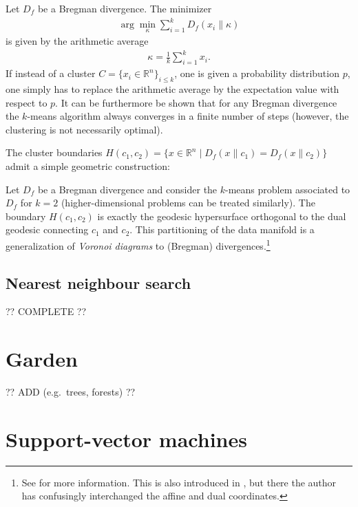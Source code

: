     \begin{property}
        Let $D_f$ be a Bregman divergence. The minimizer
        \begin{gather}
            \arg\min_\kappa\sum_{i=1}^kD_f(x_i\|\kappa)
        \end{gather}
        is given by the arithmetic average
        \begin{gather}
            \kappa = \frac{1}{k}\sum_{i=1}^kx_i.
        \end{gather}
        If instead of a cluster $C=\{x_i\in\mathbb{R}^n\}_{i\leq k}$, one is given a probability distribution $p$, one simply has to replace the arithmetic average by the expectation value with respect to $p$. It can be furthermore be shown that for any Bregman divergence the $k$-means algorithm always converges in a finite number of steps (however, the clustering is not necessarily optimal).
    \end{property}

    The cluster boundaries $H(c_1, c_2)=\{x\in\mathbb{R}^n\mid D_f(x\|c_1)=D_f(x\|c_2)\}$ admit a simple geometric construction:
    \begin{property}
        Let $D_f$ be a Bregman divergence and consider the $k$-means problem associated to $D_f$ for $k=2$ (higher-dimensional problems can be treated similarly). The boundary $H(c_1,c_2)$ is exactly the geodesic hypersurface orthogonal to the dual geodesic connecting $c_1$ and $c_2$. This partitioning of the data manifold is a generalization of \textit{Voronoi diagrams} to (Bregman) divergences.\footnote{See \cite{voronoi_bregman} for more information. This is also introduced in \cite{amari}, but there the author has confusingly interchanged the affine and dual coordinates.}
    \end{property}

\subsection{Nearest neighbour search}

    ?? COMPLETE ??

\section{Garden}

    ?? ADD (e.g.~trees, forests) ??

\section{Support-vector machines}
